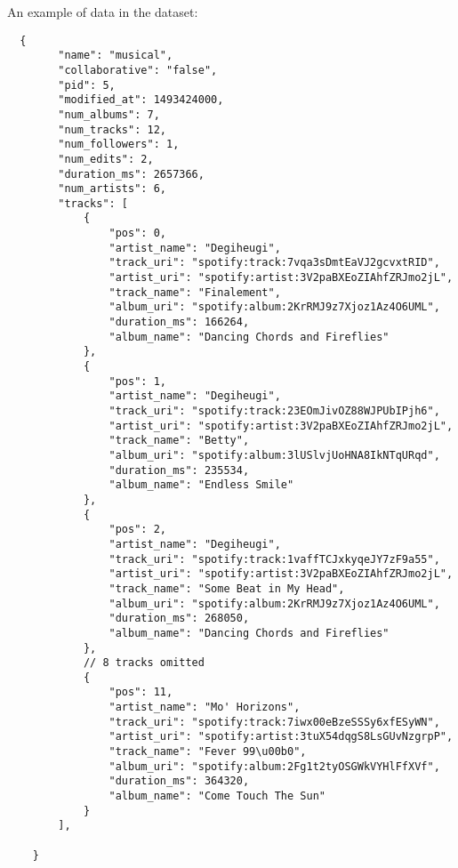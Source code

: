 \documentclass{article}
\begin{document}
An example of data in the dataset:
\begin{verbatim}
  {
        "name": "musical",
        "collaborative": "false",
        "pid": 5,
        "modified_at": 1493424000,
        "num_albums": 7,
        "num_tracks": 12,
        "num_followers": 1,
        "num_edits": 2,
        "duration_ms": 2657366,
        "num_artists": 6,
        "tracks": [
            {
                "pos": 0,
                "artist_name": "Degiheugi",
                "track_uri": "spotify:track:7vqa3sDmtEaVJ2gcvxtRID",
                "artist_uri": "spotify:artist:3V2paBXEoZIAhfZRJmo2jL",
                "track_name": "Finalement",
                "album_uri": "spotify:album:2KrRMJ9z7Xjoz1Az4O6UML",
                "duration_ms": 166264,
                "album_name": "Dancing Chords and Fireflies"
            },
            {
                "pos": 1,
                "artist_name": "Degiheugi",
                "track_uri": "spotify:track:23EOmJivOZ88WJPUbIPjh6",
                "artist_uri": "spotify:artist:3V2paBXEoZIAhfZRJmo2jL",
                "track_name": "Betty",
                "album_uri": "spotify:album:3lUSlvjUoHNA8IkNTqURqd",
                "duration_ms": 235534,
                "album_name": "Endless Smile"
            },
            {
                "pos": 2,
                "artist_name": "Degiheugi",
                "track_uri": "spotify:track:1vaffTCJxkyqeJY7zF9a55",
                "artist_uri": "spotify:artist:3V2paBXEoZIAhfZRJmo2jL",
                "track_name": "Some Beat in My Head",
                "album_uri": "spotify:album:2KrRMJ9z7Xjoz1Az4O6UML",
                "duration_ms": 268050,
                "album_name": "Dancing Chords and Fireflies"
            },
            // 8 tracks omitted
            {
                "pos": 11,
                "artist_name": "Mo' Horizons",
                "track_uri": "spotify:track:7iwx00eBzeSSSy6xfESyWN",
                "artist_uri": "spotify:artist:3tuX54dqgS8LsGUvNzgrpP",
                "track_name": "Fever 99\u00b0",
                "album_uri": "spotify:album:2Fg1t2tyOSGWkVYHlFfXVf",
                "duration_ms": 364320,
                "album_name": "Come Touch The Sun"
            }
        ],

    }
\end{verbatim}
\end{document}
